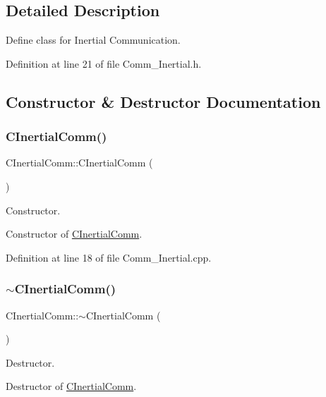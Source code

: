 \subsection{Detailed Description}
Define class for Inertial Communication. 

Definition at line 21 of file Comm\+\_\+\+Inertial.\+h.



\subsection{Constructor \& Destructor Documentation}
\mbox{\label{class_c_inertial_comm_a86917a157b0acfa80c9f178f18d882fc}} 
\subsubsection{\texorpdfstring{CInertialComm()}{CInertialComm()}}
{\footnotesize\ttfamily C\+Inertial\+Comm\+::\+C\+Inertial\+Comm (\begin{DoxyParamCaption}{ }\end{DoxyParamCaption})}



Constructor. 

Constructor of \mbox{\hyperlink{class_c_inertial_comm}{C\+Inertial\+Comm}}. 

Definition at line 18 of file Comm\+\_\+\+Inertial.\+cpp.

\mbox{\label{class_c_inertial_comm_a7673549eec2f597714a39b2c4f5ab3ae}} 
\subsubsection{\texorpdfstring{$\sim$CInertialComm()}{~CInertialComm()}}
{\footnotesize\ttfamily C\+Inertial\+Comm\+::$\sim$\+C\+Inertial\+Comm (\begin{DoxyParamCaption}{ }\end{DoxyParamCaption})}



Destructor. 

Destructor of \mbox{\hyperlink{class_c_inertial_comm}{C\+Inertial\+Comm}}. 

